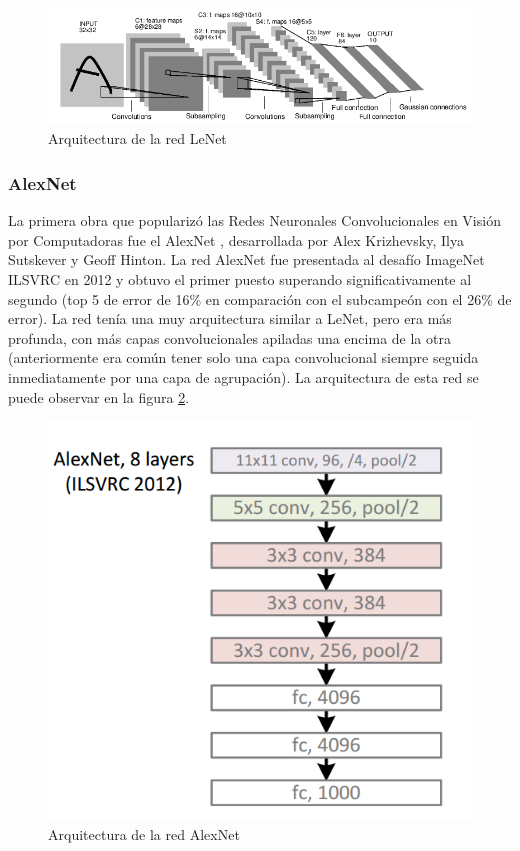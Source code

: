 \documentclass[a4paper,11pt,spanish]{book}
\begin{document}
	  \begin{figure}[h]
	    \begin{center}
	    \includegraphics[width=0.6\linewidth]{./img/lenet.png}
	    \end{center}
	    \caption{Arquitectura de la red LeNet}
	    \label{fig:lenet}
	  \end{figure}

	\subsubsection{AlexNet} \label{sec:alexnet}
	  La primera obra que popularizó las Redes Neuronales Convolucionales en Visión por Computadoras fue el AlexNet  \cite{AlexNet}, desarrollada por Alex Krizhevsky, 
	  Ilya Sutskever y Geoff Hinton.
	  La red AlexNet fue presentada al desafío ImageNet ILSVRC  en 2012 y obtuvo el primer puesto superando significativamente al segundo (top 5 de error de 16\% en
	  comparación con el subcampeón con el 26\% de error). 
	  La red tenía una muy arquitectura similar a LeNet, pero era más profunda, con más  capas convolucionales apiladas una encima de la otra
	  (anteriormente era común tener solo una capa convolucional siempre seguida inmediatamente por una capa de agrupación). La arquitectura de esta red se puede observar en la figura 
	  \ref{fig:alexnet}.
	  
	  \begin{figure}[h]
	    \begin{center}
	    \includegraphics[width=0.6\linewidth]{./img/alexnet.png}
	    \end{center}
	    \caption{Arquitectura de la red AlexNet}
	    \label{fig:alexnet}
	  \end{figure}	  
\end{document}
